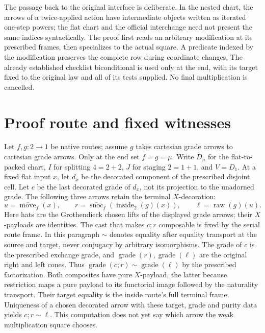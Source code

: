 \documentclass[11pt]{article}
\begin{document}
The passage back to the original interface is deliberate. In the nested chart, the arrows of a twice-applied action have intermediate objects written as iterated one-step powers; the flat chart and the official interchange need not present the same indices syntactically. The proof first reads an arbitrary modification at its prescribed frames, then specializes to the actual square. A predicate indexed by the modification preserves the complete row during coordinate changes. The already established checklist biconditional is used only at the end, with its target fixed to the original law and all of its tests supplied. No final multiplication is cancelled.

\section*{Proof route and fixed witnesses}
Let $f,g:2\to1$ be native routes; assume $g$ takes cartesian grade arrows to cartesian grade arrows. Only at the end set $f=g=\mu$. Write $D_n$ for the flat-to-packed chart, $I$ for splitting $4=2+2$, $J$ for staging $2=1+1$, and $V=D_1$. At a fixed flat input $x$, let $d_x$ be the decorated component of the prescribed disjoint cell. Let $c$ be the last decorated grade of $d_x$, not its projection to the unadorned grade. The following three arrows retain the terminal $X$-decoration:
\[
 u=\widehat{\operatorname{move}}_f(x),\qquad
 r=\widehat{\operatorname{snoc}}_f(\operatorname{inside}_2(g)(x)),\qquad
 \ell=\operatorname{raw}(g)(u).
\]
Here hats are the Grothendieck chosen lifts of the displayed grade arrows; their $X$-payloads are identities. The cast that makes $c;r$ composable is fixed by the serial route frame. In this paragraph $\sim$ denotes equality after equality transport at the source and target, never conjugacy by arbitrary isomorphisms. The grade of $c$ is the prescribed exchange grade, and $\operatorname{grade}(r),\operatorname{grade}(\ell)$ are the original right and left cones. Thus $\operatorname{grade}(c;r)\sim\operatorname{grade}(\ell)$ by the prescribed factorization. Both composites have pure $X$-payload, the latter because restriction maps a pure payload to its functorial image followed by the naturality transport. Their target equality is the inside route's full terminal frame. Uniqueness of a chosen decorated arrow with these target, grade and purity data yields $c;r\sim\ell$. This computation does not yet say which arrow the weak multiplication square chooses.
\end{document}
